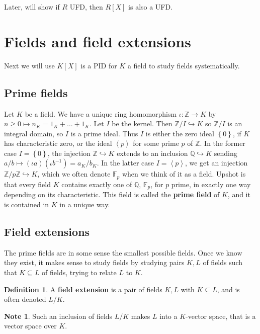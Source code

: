 \documentclass{article}
\newcommand{\F}{\mathbb{F}}
\newcommand{\Z}{\mathbb{Z}}
\newcommand{\Q}{\mathbb{Q}}
\newcommand{\rb}[1]{\left( #1 \right)}
\renewcommand{\sb}[1]{\left[ #1 \right]}
\newcommand{\cb}[1]{\left\{ #1 \right\}}
\newcommand{\ab}[1]{\left\langle #1 \right\rangle}
\theoremstyle{definition}\newtheorem{definition}{Definition}[section]
\theoremstyle{definition}\newtheorem{remark}[definition]{Remark}
\theoremstyle{definition}\newtheorem*{example}{Example}
\theoremstyle{definition}\newtheorem*{note}{Note}
\begin{document}
Later, will show if $ R $ UFD, then $ R\sb{X} $ is also a UFD.

\section{Fields and field extensions}

Next we will use $ K\sb{X} $ is a PID for $ K $ a field to study fields systematically.

\subsection{Prime fields}

Let $ K $ be a field. We have a unique ring homomorphism $ \iota : \Z \to K $ by $ n \ge 0 \mapsto n_K = 1_K + \dots + 1_K $. Let $ I $ be the kernel. Then $ \Z / I \hookrightarrow K $ so $ \Z / I $ is an integral domain, so $ I $ is a prime ideal. Thus $ I $ is either the zero ideal $ \cb{0} $, if $ K $ has characteristic zero, or the ideal $ \ab{p} $ for some prime $ p $ of $ \Z $. In the former case $ I = \cb{0} $, the injection $ \Z \hookrightarrow K $ extends to an inclusion $ \Q \hookrightarrow K $ sending $ a / b \mapsto \rb{\iota a}\rb{\iota b^{-1}} = a_K / b_K $. In the latter case $ I = \ab{p} $, we get an injection $ \Z / p\Z \hookrightarrow K $, which we often denote $ \F_p $ when we think of it as a field. Upshot is that every field $ K $ contains exactly one of $ \Q $, $ \F_p $, for $ p $ prime, in exactly one way depending on its characteristic. This field is called the \textbf{prime field} of $ K $, and it is contained in $ K $ in a unique way.

\subsection{Field extensions}

The prime fields are in some sense the smallest possible fields. Once we know they exist, it makes sense to study fields by studying pairs $ K, L $ of fields such that $ K \subseteq L $ of fields, trying to relate $ L $ to $ K $.

\begin{definition}
A \textbf{field extension} is a pair of fields $ K, L $ with $ K \subseteq L $, and is often denoted $ L / K $.
\end{definition}

\begin{note}
Such an inclusion of fields $ L / K $ makes $ L $ into a $ K $-vector space, that is a vector space over $ K $.
\end{note}
\end{document}
